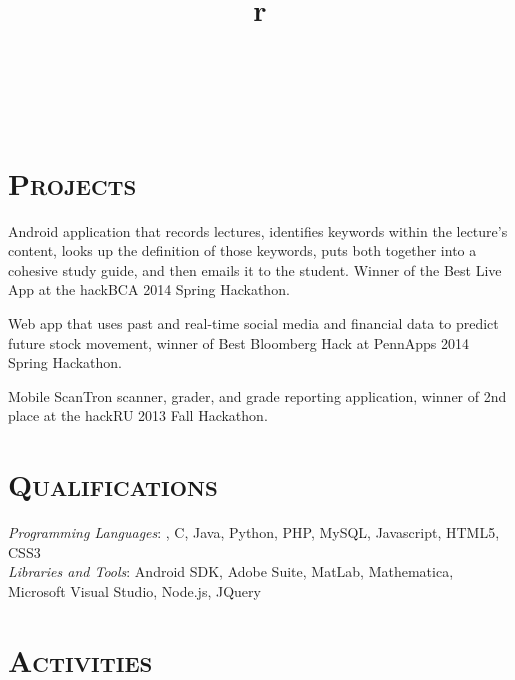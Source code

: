 \begin{resume}
\begin{formatb}
  \\
  \body\\
\end{formatb}

\section{\textsc{Projects}}

\begin{position}
Android application that records lectures, identifies keywords within the lecture's content, looks up the definition of those keywords, puts both together into a cohesive study guide, and then emails it to the student. Winner of the Best Live App at the hackBCA 2014 Spring Hackathon. 
\end{position}

\begin{position}
Web app that uses past and real-time social media and financial data to predict future stock movement, winner of Best Bloomberg Hack at PennApps 2014 Spring Hackathon.
\end{position}

\begin{position}
Mobile ScanTron scanner, grader, and grade reporting application, winner of 2nd place at the hackRU 2013 Fall Hackathon.
\end{position}

\section{\textsc{Qualifications}}

\emph{Programming Languages}: \Cplusplus, C, Java, Python, PHP, MySQL, Javascript, HTML5, CSS3 \\
\emph{Libraries and Tools}: Android SDK, Adobe Suite, MatLab, Mathematica, Microsoft Visual Studio, Node.js, JQuery

\section{\textsc{Activities}}

\begin{formatb}
  \title{r}\\
  \body\\
\end{formatb}


\end{resume}
